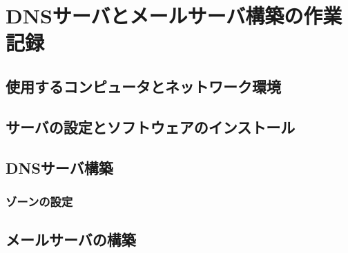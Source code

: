 \chapter{DNSサーバとメールサーバ構築の作業記録}
\section{使用するコンピュータとネットワーク環境}
\section{サーバの設定とソフトウェアのインストール}
\section{DNSサーバ構築}
\subsection{ゾーンの設定}\label{chap:ゾーンの設定}
\section{メールサーバの構築}